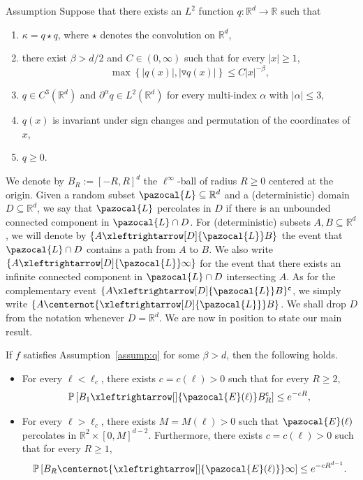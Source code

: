 \documentclass[AHL,Unicode,longabstracts,published]{cedram}
\renewcommand{\P}{\mathbb{P}}
\newcommand{\R}{\mathbb{R}}
\newcommand{\sfc}{\mathsf{c}}
\newcommand{\lr}[4]{#3\xleftrightarrow[#1]{#2} #4}
\newcommand{\nlr}[4]{#3\centernot{\xleftrightarrow[#1]{#2}} #4}
\newcommand*{\romanenumi}{\renewcommand*{\theenumi}{\roman{enumi}}}
\newcommand{\R}{\mathbb{R}}
\begin{document}
\begin{enonce}{Assumption}\label{assump:q}
Suppose that there exists an $L^2$ function $q:\R^d\to\R$ such that
\begin{enumerate}\romanenumi
\item\label{Assum1.1.i} $\kappa=q\star q$, where $\star$ denotes the convolution on $\R^d$,
\item\label{Assum1.1.ii} there exist $\beta>d/2$ and $C\in(0,\infty)$ such that for every $|x|\geq1$,
\begin{equation}\label{eq:decay_q}
\max\left\{|q(x)|, \left|\triangledown q(x)\right|\right\}\leq C|x|^{-\beta},
\end{equation}
\item\label{Assum1.1.iii} $q\in C^3(\R^d)$ and $\partial^\alpha q\in L^2(\R^d)$ for every multi-index $\alpha$ with $|\alpha|\leq3$,
\item\label{Assum1.1.iv} $q(x)$ is invariant under sign changes and permutation of the coordinates of $x$,
\item\label{Assum1.1.v} $q\geq 0$.
\end{enumerate}
\end{enonce}


We denote by $B_R:=[-R,R]^d$ the $\ell^\infty$-ball of radius $R\geq0$ centered at the origin. Given a random subset $\pazocal{L}\subseteq\R^d$ and a (deterministic) domain $D\subseteq \R^d$, we say that $\pazocal{L}$ percolates in $D$ if there is an unbounded connected component in $\pazocal{L}\cap D$. For (deterministic) subsets $A,B\subseteq\R^d$, we will denote by
{\small$\{\lr{D}{\pazocal{L}}{A}{B}\}$}
the event that $\pazocal{L}\cap D$ contains a path from $A$ to $B$. We also write
{\small$\{\lr{D}{\pazocal{L}}{A}{\infty}\}
$}
for the event that there exists an infinite connected component in $\pazocal{L}\cap D$ intersecting $A$. As for the complementary event
$\{\lr{D}{\pazocal{L}}{A}{B}\}^{\sfc}$,
we simply write {\small$\{\nlr{D}{\pazocal{L}}{A}{B}\}$}.
We shall drop $D$ from the notation whenever $D=\R^d$. We are now in position to state our main result.

\begin{theo}\label{thm:sharpness}
If $f$ satisfies Assumption~\ref{assump:q} for some $\beta>d$, then the following holds.
\begin{itemize}
\item For every $\ell<\ell_c$, there exists $c=c(\ell)>0$ such that for every $R\geq2$,
\begin{equation}\label{eq:exp_decay}
\P\left[\lr{}{\pazocal{E}(\ell)}{B_1}{B_R^{\sfc}}\right]\leq e^{-cR},
\end{equation}
\item For every $\ell>\ell_c$, there exists $M=M(\ell)>0$ such that $\pazocal{E}(\ell)$ percolates in $\R^2\times[0,M]^{d-2}$. Furthermore, there exists $c=c(\ell)>0$ such that for every $R\geq1$,
\begin{equation}\label{eq:exp_decay2}
\P\left[\nlr{}{\pazocal{E}(\ell)}{B_R}{\infty}\right]\leq e^{-cR^{d-1}}.
\end{equation}
\end{itemize}
\end{theo}
\end{document}
